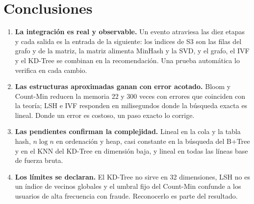 \documentclass[11pt,letterpaper]{article}
\begin{document}
\section{Conclusiones}

\begin{enumerate}[leftmargin=1.2em]
\item \textbf{La integraci\'on es real y observable.} Un evento atraviesa las diez etapas y cada salida es la entrada de la siguiente: los \'\i ndices de S3 son las filas del grafo y de la matriz, la matriz alimenta MinHash y la SVD, y el grafo, el IVF y el KD-Tree se combinan en la recomendaci\'on. Una prueba autom\'atica lo verifica en cada cambio.
\item \textbf{Las estructuras aproximadas ganan con error acotado.} Bloom y Count-Min reducen la memoria 22 y 300 veces con errores que coinciden con la teor\'ia; LSH e IVF responden en milisegundos donde la b\'usqueda exacta es lineal. Donde un error es costoso, un paso exacto lo corrige.
\item \textbf{Las pendientes confirman la complejidad.} Lineal en la cola y la tabla hash, $n\log n$ en ordenaci\'on y heap, casi constante en la b\'usqueda del B+Tree y en el KNN del KD-Tree en dimensi\'on baja, y lineal en todas las l\'ineas base de fuerza bruta.
\item \textbf{Los l\'imites se declaran.} El KD-Tree no sirve en 32 dimensiones, LSH no es un \'indice de vecinos globales y el umbral fijo del Count-Min confunde a los usuarios de alta frecuencia con fraude. Reconocerlo es parte del resultado.
\end{enumerate}

\end{document}
